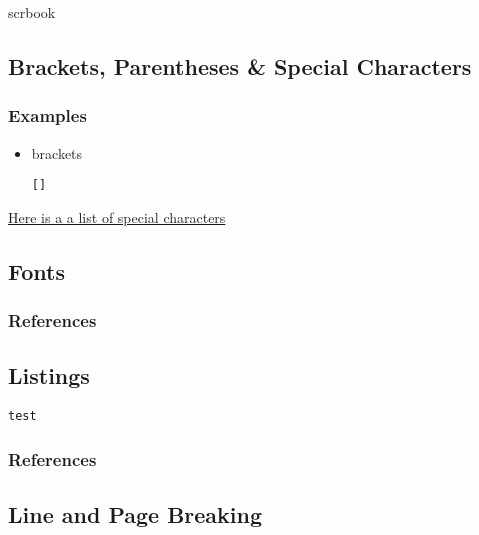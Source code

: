 scrbook \autocite{KOH01}
\subsection{Brackets, Parentheses \& Special Characters}
\subsubsection{Examples}
\begin{itemize}
\item{brackets
\begin{lstlisting}[style=cstm-lists-latex-oneline-sty]
[]
\end{lstlisting}
}
\end{itemize}
\href{https://de.wikibooks.org/wiki/LaTeX-Kompendium:\_Sonderzeichen}{Here is a
a list of special characters}
\subsection{Fonts}
\subsubsection{References}
\subsection{Listings}

\begin{lstlisting}[style=cstm-lists-latex-sty]
test
\end{lstlisting}
\subsubsection{References}

\subsection{Line and Page Breaking}
